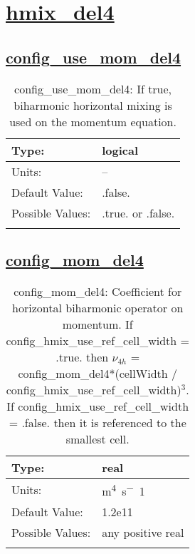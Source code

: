 \section[hmix\_del4]{\hyperref[sec:nm_tab_hmix_del4]{hmix\_del4}}
\label{sec:nm_sec_hmix_del4}
\subsection[config\_use\_mom\_del4]{\hyperref[sec:nm_tab_hmix_del4]{config\_use\_mom\_del4}}
\label{subsec:nm_sec_config_use_mom_del4}
\begin{center}
\begin{longtable}{| p{2.0in} || p{4.0in} |}
    \hline
    Type: & logical \\
    \hline
    Units: & -- \\
    \hline
    Default Value: & .false. \\
    \hline
    Possible Values: & .true. or .false. \\
    \hline
    \caption{config\_use\_mom\_del4: If true, biharmonic horizontal mixing is used on the momentum equation.}
\end{longtable}
\end{center}
\subsection[config\_mom\_del4]{\hyperref[sec:nm_tab_hmix_del4]{config\_mom\_del4}}
\label{subsec:nm_sec_config_mom_del4}
\begin{center}
\begin{longtable}{| p{2.0in} || p{4.0in} |}
    \hline
    Type: & real \\
    \hline
    Units: & \si{m^4.s^-1} \\
    \hline
    Default Value: & 1.2e11 \\
    \hline
    Possible Values: & any positive real \\
    \hline
    \caption{config\_mom\_del4: Coefficient for horizontal biharmonic operator on momentum.  If config\_hmix\_use\_ref\_cell\_width = .true. then $\nu_{4h}$ = config\_mom\_del4*(cellWidth / config\_hmix\_use\_ref\_cell\_width)$^3$. If config\_hmix\_use\_ref\_cell\_width = .false. then it is referenced to the smallest cell.}
\end{longtable}
\end{center}
